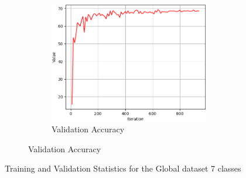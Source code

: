 \begin{figure}[ht]
\begin{subfigure}{\textwidth}
        \begin{subfigure}{0.32\textwidth}
            \includegraphics[width=\linewidth]{Images/training/Global_7_val_acc.png}
            \caption{Validation Accuracy}
            \label{Global_7_val_acc}
        \end{subfigure}
    \end{subfigure}
    \caption{Training and Validation Statistics for the Global dataset 7 classes}
    \label{Global_training}
\end{figure}
    
